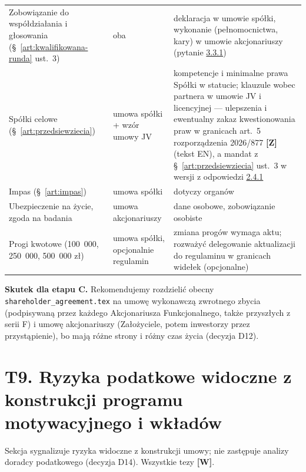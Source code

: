 \documentclass[12pt,a4paper]{report}
\newcommand{\Wiar}[1]{\textbf{[#1]}}
\begin{document}
\begin{longtable}{@{}p{4.6cm} p{2.4cm} p{7.2cm}@{}}
Zobowiązanie do współdziałania i głosowania (§~\ref{art:kwalifikowana-runda} ust.~3) & oba & deklaracja w umowie spółki, wykonanie (pełnomocnictwa, kary) w umowie akcjonariuszy (pytanie \hyperref[memo:3.3.1]{3.3.1}) \\
Spółki celowe (§~\ref{art:przedsiewziecia}) & umowa spółki + wzór umowy JV & kompetencje i minimalne prawa Spółki w statucie; klauzule wobec partnera w umowie JV i licencyjnej --- ulepszenia i ewentualny zakaz kwestionowania praw w granicach art.~5 rozporządzenia 2026/877 \Wiar{Z} (tekst EN), a mandat z §~\ref{art:przedsiewziecia} ust.~3 w wersji z odpowiedzi \hyperref[memo:2.4.1]{2.4.1} \\
Impas (§~\ref{art:impas}) & umowa spółki & dotyczy organów \\
Ubezpieczenie na życie, zgoda na badania & umowa akcjonariuszy & dane osobowe, zobowiązanie osobiste \\
Progi kwotowe (100~000, 250~000, 500~000 zł) & umowa spółki, opcjonalnie regulamin & zmiana progów wymaga aktu; rozważyć delegowanie aktualizacji do regulaminu w granicach widełek (opcjonalne) \\
\bottomrule
\end{longtable}

\textbf{Skutek dla etapu C.} Rekomendujemy rozdzielić obecny \texttt{shareholder\_agreement.tex} na umowę wykonawczą zwrotnego zbycia (podpisywaną przez każdego Akcjonariusza Funkcjonalnego, także przyszłych z serii F) i umowę akcjonariuszy (Założyciele, potem inwestorzy przez przystąpienie), bo mają różne strony i różny czas życia (decyzja D12).

\section*{T9. Ryzyka podatkowe widoczne z konstrukcji programu motywacyjnego i wkładów}

Sekcja sygnalizuje ryzyka widoczne z konstrukcji umowy; nie zastępuje analizy doradcy podatkowego (decyzja D14). Wszystkie tezy \Wiar{W}.
\end{document}
